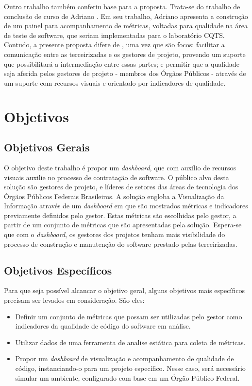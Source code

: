 Outro trabalho também conferiu base para a proposta. Trata-se do trabalho de conclusão de curso de Adriano \cite{silva_painel_2014}. Em seu trabalho, Adriano apresenta a construção de um painel para acompanhamento de métricas, voltadas para qualidade na área de teste de software, que seriam implementadas para o laboratório CQTS. Contudo, a presente proposta difere de \cite{silva_painel_2014}, uma vez que são focos: facilitar a comunicação entre as terceirizadas e os gestores de projeto, provendo um suporte que possibilitará a intermediação entre essas partes; e permitir que a qualidade seja aferida pelos gestores de projeto - membros dos Órgãos Públicos - através de um suporte com recursos visuais e orientado por indicadores de qualidade.

	\section{Objetivos}

	\subsection{Objetivos Gerais} %
	\label{sub:objetivos_gerais}
	
	O objetivo deste trabalho é propor um \textit{dashboard}, que com auxílio de recursos visuais auxilie no processo de contratação de software. O público alvo desta solução são gestores de projeto, e líderes de setores das áreas de tecnologia dos Órgãos Públicos Federais Brasileiros. A solução engloba a Visualização da Informação através de um \textit{dashboard} em que são mostrados métricas e indicadores previamente definidos pelo gestor. Estas métricas são escolhidas pelo gestor, a partir de um conjunto de métricas que são apresentadas pela solução. Espera-se que com o \textit{dashboard}, os gestores dos projetos tenham mais visibilidade do processo de construção e manutenção do software prestado pelas terceirizadas.


	\subsection{Objetivos Específicos} %
	\label{sub:objetivos_específicos}

	Para que seja possível alcancar o objetivo geral, alguns objetivos mais específicos precisam ser levados em consideração. São eles:
		 
	\begin{itemize}
		\item Definir um conjunto de métricas que possam ser utilizadas pelo gestor como indicadores da qualidade de código do software em análise.
		\item Utilizar dados de uma ferramenta de analise estática para coleta de métricas.  
		\item Propor um \textit{dashboard} de visualização e acompanhamento de qualidade de código, instanciando-o para um projeto específico. Nesse caso, será necessário simular um ambiente, configurado com base em um Órgão Público Federal.
		
	\end{itemize}
	
